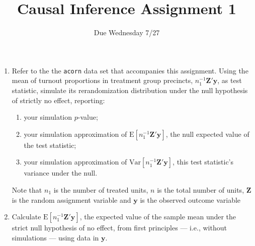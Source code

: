 \documentclass{article}
\title{Causal Inference Assignment 1}
\author{Due Wednesday 7/27}
\begin{document}
\maketitle

\begin{enumerate}
\item Refer to the the \texttt{acorn} data set that accompanies this assignment.  Using the mean of turnout proportions in
treatment group precincts, $n_{1}^{-1}\mathbf{Z}'\mathbf{y}$, as
test statistic, simulate its rerandomization distribution under the
null hypothesis of strictly no effect, reporting: \label{q:simmoments}
\begin{enumerate}
  \item your simulation $p$-value; 
  \item your simulation approximation of $\mathrm{E}[
    n_{1}^{-1}\mathbf{Z}'\mathbf{y}]$, the null expected value of the test
    statistic; 
  \item your simulation approximation of
    $\mathrm{Var}[n_{1}^{-1}\mathbf{Z}'\mathbf{y}]$, this test
    statistic's variance under the null.
  \end{enumerate}
 Note that $n_1$ is the number of treated units, $n$ is the total number of units, $\mathbf{Z}$ is the random assignment variable and $\mathbf{y}$ is the observed outcome variable
\item Calculate $\mathrm{E} [ n_{1}^{-1}\mathbf{Z}'\mathbf{y} ]$, the expected value of the
  sample mean under the strict null hypothesis of no effect, from first principles --- i.e., without simulations ---  using data in $\mathbf{y}$.  \label{q:exactEV}

\end{enumerate}
\end{document}
